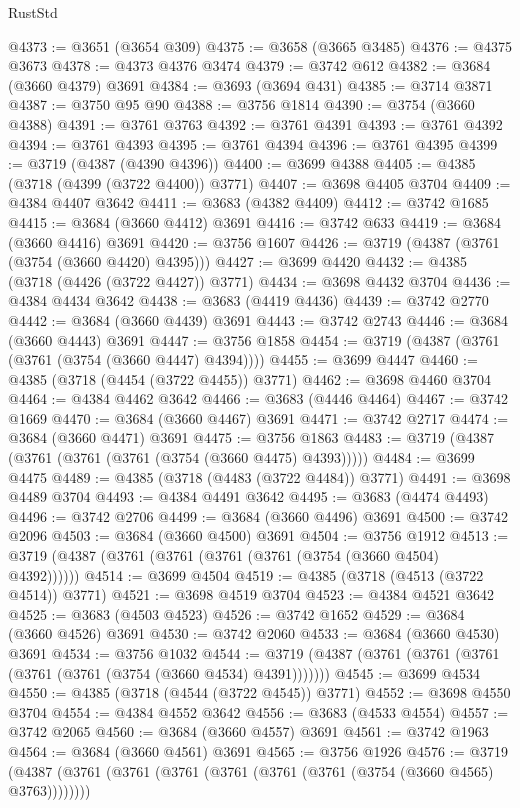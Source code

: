 \begin{lexlean}{RustStd}
\begin{coremodule}
{\begin{coremodule}
{{{{{{{{{{{{{{{{{{{{{{{{{{{{{{{{{{{{{{{{{{{{{{{@4373 := @3651 (@3654 @309)
@4375 := @3658 (@3665 @3485)
@4376 := @4375 @3673
@4378 := @4373 @4376 @3474
@4379 := @3742 @612
@4382 := @3684 (@3660 @4379) @3691
@4384 := @3693 (@3694 @431)
@4385 := @3714 @3871
@4387 := @3750 @95 @90
@4388 := @3756 @1814
@4390 := @3754 (@3660 @4388)
@4391 := @3761 @3763
@4392 := @3761 @4391
@4393 := @3761 @4392
@4394 := @3761 @4393
@4395 := @3761 @4394
@4396 := @3761 @4395
@4399 := @3719 (@4387 (@4390 @4396))
@4400 := @3699 @4388
@4405 := @4385 (@3718 (@4399 (@3722 @4400)) @3771)
@4407 := @3698 @4405 @3704
@4409 := @4384 @4407 @3642
@4411 := @3683 (@4382 @4409)
@4412 := @3742 @1685
@4415 := @3684 (@3660 @4412) @3691
@4416 := @3742 @633
@4419 := @3684 (@3660 @4416) @3691
@4420 := @3756 @1607
@4426 := @3719 (@4387 (@3761 (@3754 (@3660 @4420) @4395)))
@4427 := @3699 @4420
@4432 := @4385 (@3718 (@4426 (@3722 @4427)) @3771)
@4434 := @3698 @4432 @3704
@4436 := @4384 @4434 @3642
@4438 := @3683 (@4419 @4436)
@4439 := @3742 @2770
@4442 := @3684 (@3660 @4439) @3691
@4443 := @3742 @2743
@4446 := @3684 (@3660 @4443) @3691
@4447 := @3756 @1858
@4454 := @3719 (@4387 (@3761 (@3761 (@3754 (@3660 @4447) @4394))))
@4455 := @3699 @4447
@4460 := @4385 (@3718 (@4454 (@3722 @4455)) @3771)
@4462 := @3698 @4460 @3704
@4464 := @4384 @4462 @3642
@4466 := @3683 (@4446 @4464)
@4467 := @3742 @1669
@4470 := @3684 (@3660 @4467) @3691
@4471 := @3742 @2717
@4474 := @3684 (@3660 @4471) @3691
@4475 := @3756 @1863
@4483 := @3719 (@4387 (@3761 (@3761 (@3761 (@3754 (@3660 @4475) @4393)))))
@4484 := @3699 @4475
@4489 := @4385 (@3718 (@4483 (@3722 @4484)) @3771)
@4491 := @3698 @4489 @3704
@4493 := @4384 @4491 @3642
@4495 := @3683 (@4474 @4493)
@4496 := @3742 @2706
@4499 := @3684 (@3660 @4496) @3691
@4500 := @3742 @2096
@4503 := @3684 (@3660 @4500) @3691
@4504 := @3756 @1912
@4513 := @3719 (@4387 (@3761 (@3761 (@3761 (@3761 (@3754 (@3660 @4504) @4392))))))
@4514 := @3699 @4504
@4519 := @4385 (@3718 (@4513 (@3722 @4514)) @3771)
@4521 := @3698 @4519 @3704
@4523 := @4384 @4521 @3642
@4525 := @3683 (@4503 @4523)
@4526 := @3742 @1652
@4529 := @3684 (@3660 @4526) @3691
@4530 := @3742 @2060
@4533 := @3684 (@3660 @4530) @3691
@4534 := @3756 @1032
@4544 := @3719 (@4387 (@3761 (@3761 (@3761 (@3761 (@3761 (@3754 (@3660 @4534) @4391)))))))
@4545 := @3699 @4534
@4550 := @4385 (@3718 (@4544 (@3722 @4545)) @3771)
@4552 := @3698 @4550 @3704
@4554 := @4384 @4552 @3642
@4556 := @3683 (@4533 @4554)
@4557 := @3742 @2065
@4560 := @3684 (@3660 @4557) @3691
@4561 := @3742 @1963
@4564 := @3684 (@3660 @4561) @3691
@4565 := @3756 @1926
@4576 := @3719 (@4387 (@3761 (@3761 (@3761 (@3761 (@3761 (@3761 (@3754 (@3660 @4565) @3763))))))))
}}}}}}}}}}}}}}}}}}}}}}}}}}}}}}}}}}}}}}}}}}}}}}}
\end{coremodule}}
\end{coremodule}
\end{lexlean}
